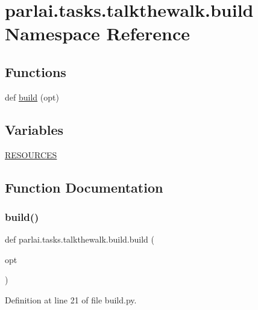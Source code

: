 \hypertarget{namespaceparlai_1_1tasks_1_1talkthewalk_1_1build}{}\section{parlai.\+tasks.\+talkthewalk.\+build Namespace Reference}
\label{namespaceparlai_1_1tasks_1_1talkthewalk_1_1build}
\subsection*{Functions}
\begin{DoxyCompactItemize}
\item 
def \hyperlink{namespaceparlai_1_1tasks_1_1talkthewalk_1_1build_ad51286ba43b5d307706a281240d1aa7b}{build} (opt)
\end{DoxyCompactItemize}
\subsection*{Variables}
\begin{DoxyCompactItemize}
\item 
\hyperlink{namespaceparlai_1_1tasks_1_1talkthewalk_1_1build_ab1481f6e65d0f57bda65c35ece83acea}{R\+E\+S\+O\+U\+R\+C\+ES}
\end{DoxyCompactItemize}


\subsection{Function Documentation}
\mbox{\label{namespaceparlai_1_1tasks_1_1talkthewalk_1_1build_ad51286ba43b5d307706a281240d1aa7b}} 
\subsubsection{\texorpdfstring{build()}{build()}}
{\footnotesize\ttfamily def parlai.\+tasks.\+talkthewalk.\+build.\+build (\begin{DoxyParamCaption}\item[{}]{opt }\end{DoxyParamCaption})}



Definition at line 21 of file build.\+py.


